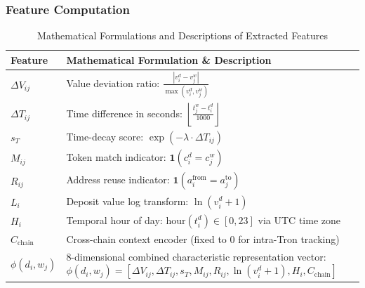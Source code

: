 \documentclass[journal]{IEEEtran}
\begin{document}
    \subsubsection{Feature Computation}
    \begin{table}[htbp]
    \caption{Mathematical Formulations and Descriptions of Extracted Features}
    \label{tab:features}
    \centering
    \begin{tabular}{lp{6.8cm}} %
    \toprule
    \textbf{Feature} & \textbf{Mathematical Formulation \& Description} \\
    \midrule
    $\Delta V_{ij}$ & Value deviation ratio: $\displaystyle \frac{|v_i^d - v_j^w|}{\max(v_i^d, v_j^w)}$ \\ [1.8ex]
    $\Delta T_{ij}$ & Time difference in seconds: $\displaystyle \left\lfloor \frac{t_j^w - t_i^d}{1000} \right\rfloor$ \\ [1.8ex]
    $s_T$           & Time-decay score: $\exp(-\lambda \cdot \Delta T_{ij})$ \\ [0.8ex]
    $M_{ij}$        & Token match indicator: $\mathbf{1}\left(c_i^d = c_j^w\right)$ \\ [0.8ex]
    $R_{ij}$        & Address reuse indicator: $\mathbf{1}\left(a_i^{\text{from}} = a_j^{\text{to}}\right)$ \\ [0.8ex]
    $L_i$           & Deposit value log transform: $\ln(v_i^d + 1)$ \\ [0.8ex]
    $H_i$           & Temporal hour of day: $\text{hour}(t_i^d) \in [0, 23]$ via UTC time zone \\ [0.8ex]
    $C_{\text{chain}}$ & Cross-chain context encoder (fixed to $0$ for intra-Tron tracking) \\
    \midrule
    $\phi(d_i, w_j)$ & 8-dimensional combined characteristic representation vector: $\phi(d_i, w_j) = [\Delta V_{ij}, \Delta T_{ij}, s_T, M_{ij}, R_{ij}, \ln(v_i^d + 1), H_i, C_{\text{chain}}]$ \\
    \bottomrule
    \end{tabular}
    \end{table}
    
\end{document}

